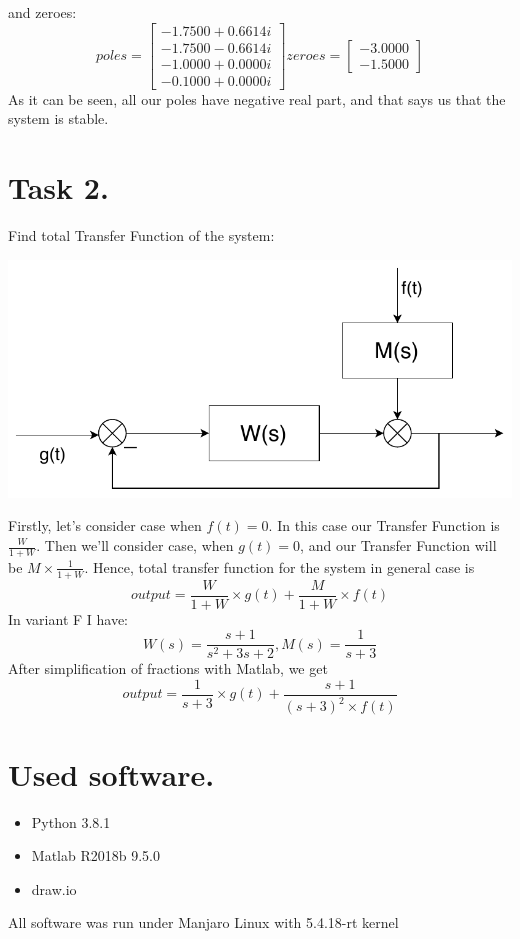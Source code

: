 \documentclass[a4paper,12pt]{article}
\begin{document}
    and zeroes:
    \begin{equation*}
    poles =
    \begin{bmatrix}
      -1.7500 + 0.6614i\\
      -1.7500 - 0.6614i\\
      -1.0000 + 0.0000i\\
      -0.1000 + 0.0000i
    \end{bmatrix} 
    zeroes =
    \begin{bmatrix}
        -3.0000\\
        -1.5000
    \end{bmatrix}
    \end{equation*}
    As it can be seen, all our poles have negative real part, and that says us 
    that the system is stable.
\newpage
\section{Task 2.}
    Find total Transfer Function of the system:
    \begin{center}
        \includegraphics[scale=0.5]{../Task2/ToReport/System.pdf}
    \end{center}
    Firstly, let's consider case when $f(t)=0$. In this case our Transfer
    Function is $\frac{W}{1+W}$. Then we'll consider case, when $g(t)=0$, 
    and our Transfer Function will be $M \times \frac{1}{1+W}$.
    Hence, total transfer function for the system in general case is
    \begin{equation*}
        output = \frac{W}{1+W} \times g(t) + \frac{M}{1+W} \times f(t)
    \end{equation*}  
    In variant F I have:
    \begin{equation*}
    W(s) = \frac{s+1}{s^2+3s+2}, 
    M(s) = \frac{1}{s+3}
    \end{equation*}
    After simplification of fractions with Matlab, we get 
    \begin{equation*}
        output = \frac{1}{s+3} \times g(t) + \frac{s+1}{(s+3)^2 \times f(t)}
    \end{equation*}


\section{Used software.}
\begin{itemize}
    \item Python 3.8.1
    \item Matlab R2018b 9.5.0
    \item draw.io
\end{itemize}
All software was run under Manjaro Linux with 5.4.18-rt kernel
\end{document}
